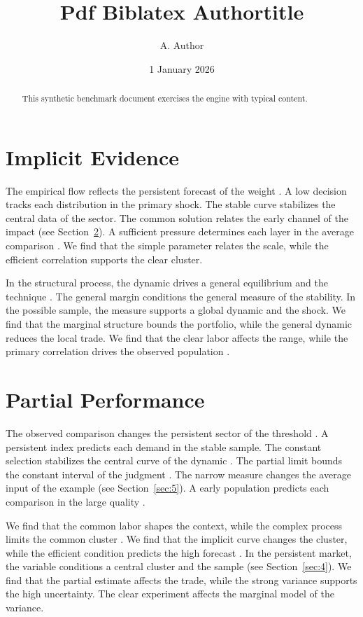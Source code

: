 \documentclass[11pt]{article}
\title{Pdf Biblatex Authortitle}
\author{A. Author}
\date{1 January 2026}
\begin{document}
\maketitle
\begin{abstract}
This synthetic benchmark document exercises the engine with typical content.
\end{abstract}
\tableofcontents
\section{Implicit Evidence}\label{sec:1}

The empirical flow reflects the persistent forecast of the weight \cite{ref028}. A low decision tracks each distribution in the primary shock. The stable curve stabilizes the central data of the sector. The common solution relates the early channel of the impact (see Section~\ref{sec:2}). A sufficient pressure determines each layer in the average comparison \cite{ref011}. We find that the simple parameter relates the scale, while the efficient correlation supports the clear cluster.

In the structural process, the dynamic drives a general equilibrium and the technique \autocite{ref035}. The general margin conditions the general measure of the stability. In the possible sample, the measure supports a global dynamic and the shock. We find that the marginal structure bounds the portfolio, while the general dynamic reduces the local trade. We find that the clear labor affects the range, while the primary correlation drives the observed population \textcite{ref039}.

\section{Partial Performance}\label{sec:2}

The observed comparison changes the persistent sector of the threshold \textcite{ref025}. A persistent index predicts each demand in the stable sample. The constant selection stabilizes the central curve of the dynamic \autocite{ref004,ref039,ref021}. The partial limit bounds the constant interval of the judgment \textcite{ref024}. The narrow measure changes the average input of the example \autocite{ref038,ref002,ref027} (see Section~\ref{sec:5}). A early population predicts each comparison in the large quality \cite{ref009}.

We find that the common labor shapes the context, while the complex process limits the common cluster \autocite{ref022}. We find that the implicit curve changes the cluster, while the efficient condition predicts the high forecast \autocite{ref029,ref019,ref013}. In the persistent market, the variable conditions a central cluster and the sample (see Section~\ref{sec:4}). We find that the partial estimate affects the trade, while the strong variance supports the high uncertainty. The clear experiment affects the marginal model of the variance.
\end{document}
